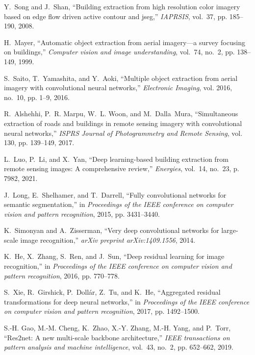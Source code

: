 \documentclass[lettersize,journal]{IEEEtran}
\begin{document}
\begin{thebibliography}{10}
Y.~Song and J.~Shan, ``Building extraction from high resolution color imagery
  based on edge flow driven active contour and jseg,'' \emph{IAPRSIS}, vol.~37,
  pp. 185--190, 2008.

H.~Mayer, ``Automatic object extraction from aerial imagery—a survey focusing
  on buildings,'' \emph{Computer vision and image understanding}, vol.~74,
  no.~2, pp. 138--149, 1999.

S.~Saito, T.~Yamashita, and Y.~Aoki, ``Multiple object extraction from aerial
  imagery with convolutional neural networks,'' \emph{Electronic Imaging}, vol.
  2016, no.~10, pp. 1--9, 2016.

R.~Alshehhi, P.~R. Marpu, W.~L. Woon, and M.~Dalla~Mura, ``Simultaneous
  extraction of roads and buildings in remote sensing imagery with
  convolutional neural networks,'' \emph{ISPRS Journal of Photogrammetry and
  Remote Sensing}, vol. 130, pp. 139--149, 2017.

L.~Luo, P.~Li, and X.~Yan, ``Deep learning-based building extraction from
  remote sensing images: A comprehensive review,'' \emph{Energies}, vol.~14,
  no.~23, p. 7982, 2021.

J.~Long, E.~Shelhamer, and T.~Darrell, ``Fully convolutional networks for
  semantic segmentation,'' in \emph{Proceedings of the IEEE conference on
  computer vision and pattern recognition}, 2015, pp. 3431--3440.

K.~Simonyan and A.~Zisserman, ``Very deep convolutional networks for
  large-scale image recognition,'' \emph{arXiv preprint arXiv:1409.1556}, 2014.

K.~He, X.~Zhang, S.~Ren, and J.~Sun, ``Deep residual learning for image
  recognition,'' in \emph{Proceedings of the IEEE conference on computer vision
  and pattern recognition}, 2016, pp. 770--778.

S.~Xie, R.~Girshick, P.~Doll{\'a}r, Z.~Tu, and K.~He, ``Aggregated residual
  transformations for deep neural networks,'' in \emph{Proceedings of the IEEE
  conference on computer vision and pattern recognition}, 2017, pp. 1492--1500.

S.-H. Gao, M.-M. Cheng, K.~Zhao, X.-Y. Zhang, M.-H. Yang, and P.~Torr,
  ``Res2net: A new multi-scale backbone architecture,'' \emph{IEEE transactions
  on pattern analysis and machine intelligence}, vol.~43, no.~2, pp. 652--662,
  2019.


\end{thebibliography}
\end{document}

